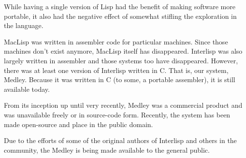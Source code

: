 While having a single version of Lisp had the benefit of making
software more portable, it also had the negative effect of 
somewhat stifling the exploration in the language.

MacLisp was written in assembler code for particular machines.  Since
those machines don't exist anymore, MacLisp itself has disappeared.
Interlisp was also largely written in assembler and those systems too
have disappeared.  However, there was at least one version of Interlisp
written in C.  That is, our system, Medley.  Because it was written in
C (to some, a portable assembler), it is still available today.

From its inception up until very recently, Medley was a commercial
product and was unavailable freely or in source-code form.  Recently,
the system has been made open-source and place in the public domain.

Due to the efforts of some of the original authors of Interlisp and
others in the community, the Medley is being made available to the
general public.







